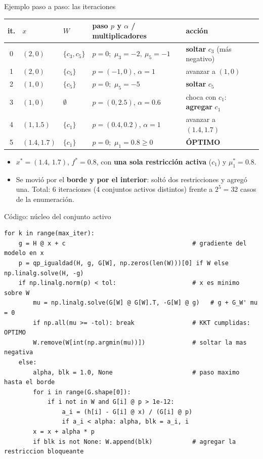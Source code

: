 \documentclass[aspectratio=169]{beamer}
\begin{document}
\begin{frame}{Ejemplo paso a paso: las iteraciones}
  \small
  \begin{center}
  \begin{tabular}{clllll}
    \toprule
    it. & $x$ & $W$ & paso $p$ y $\alpha$ / multiplicadores & acción\\
    \midrule
    0 & $(2,0)$ & $\{c_3,c_5\}$ & $p=0$;\ $\mu_3=-2,\ \mu_5=-1$ & \textbf{soltar} $c_3$ (más negativo)\\
    1 & $(2,0)$ & $\{c_5\}$ & $p=(-1,0)$, $\alpha=1$ & avanzar a $(1,0)$\\
    2 & $(1,0)$ & $\{c_5\}$ & $p=0$;\ $\mu_5=-5$ & \textbf{soltar} $c_5$\\
    3 & $(1,0)$ & $\emptyset$ & $p=(0,2.5)$, $\alpha=0.6$ & choca con $c_1$: \textbf{agregar} $c_1$\\
    4 & $(1,1.5)$ & $\{c_1\}$ & $p=(0.4,0.2)$, $\alpha=1$ & avanzar a $(1.4,1.7)$\\
    5 & $(1.4,1.7)$ & $\{c_1\}$ & $p=0$;\ $\mu_1=0.8\ge0$ & \textbf{ÓPTIMO}\\
    \bottomrule
  \end{tabular}
  \end{center}
  \normalsize
  \begin{itemize}
    \item $x^\ast=(1.4,\,1.7)$, $f^\ast=0.8$, con \textbf{una sola restricción activa} ($c_1$) y $\mu_1^\ast=0.8$.
    \item Se movió por el \textbf{borde y por el interior}: soltó dos restricciones y agregó una. Total: 6 iteraciones (4 conjuntos activos distintos) frente a $2^5=32$ casos de la enumeración.
  \end{itemize}
\end{frame}

\begin{frame}[fragile]{Código: núcleo del conjunto activo}
\begin{lstlisting}
for k in range(max_iter):
    g = H @ x + c                                   # gradiente del modelo en x
    p = qp_igualdad(H, g, G[W], np.zeros(len(W)))[0] if W else np.linalg.solve(H, -g)
    if np.linalg.norm(p) < tol:                     # x es minimo sobre W
        mu = np.linalg.solve(G[W] @ G[W].T, -G[W] @ g)   # g + G_W' mu = 0
        if np.all(mu >= -tol): break                # KKT cumplidas: OPTIMO
        W.remove(W[int(np.argmin(mu))])             # soltar la mas negativa
    else:
        alpha, blk = 1.0, None                      # paso maximo hasta el borde
        for i in range(G.shape[0]):
            if i not in W and G[i] @ p > 1e-12:
                a_i = (h[i] - G[i] @ x) / (G[i] @ p)
                if a_i < alpha: alpha, blk = a_i, i
        x = x + alpha * p
        if blk is not None: W.append(blk)           # agregar la restriccion bloqueante
\end{lstlisting}
\end{frame}
\end{document}
